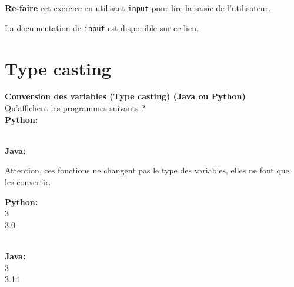 \begin{Exercice}[5 minutes]
\textbf{Re-faire} cet exercice en utilisant \texttt{input} pour lire la saisie de l'utilisateur.
\begin{conseil}
La documentation de \texttt{input} est \href{https://docs.python.org/fr/3.13/library/functions.html\#input}{disponible sur ce lien}.
\end{conseil} 

\begin{solution}
 
\end{solution}

\begin{solution}
 
\end{solution}
\end{Exercice}

\section{Type casting}


\begin{Exercice}[5 minutes] \textbf{Conversion des variables (Type casting) (Java ou Python)}\\
   Qu'affichent les programmes suivants ? \\
   
   \textbf{Python:}
   
   
   \textbf{\\Java:}
   
    
   
    \begin{conseil}
      	Attention, ces fonctions ne changent pas le type des variables, elles ne font que les convertir.
        
    \end{conseil}
    \begin{solution}
     
    \textbf{Python:}\\
    3\\
    3.0
    
    \textbf{\\Java:}\\
    3\\
    3.14 \\
    \end{solution}   
\end{Exercice}

